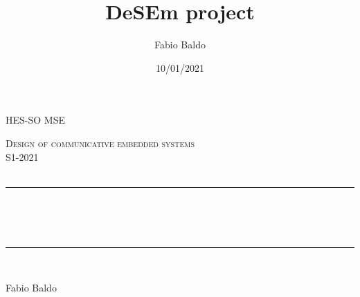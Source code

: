 
\title{DeSEm project}													%
\author{Fabio Baldo}														%
\date{10/01/2021}														%



\makeatletter
\let\thetitle\@title
\let\theauthor\@author
\let\thedate\@date
\makeatother
\pagestyle{fancy}
\fancyhf{}
\rhead{\theauthor}
\lhead{\thetitle}
\cfoot{\thepage}
\newcommand{\mis}[3]{(#1 \pm #2) \ #3}
\newcommand{\misp}[3]{(#1 \#3 \pm #2}



\begin{titlepage}
	
    \begin{center}				
    \textsc{\LARGE HES-SO MSE}\\[2.0 cm]						%
    
        \vspace*{2.00 cm}
    
	\textsc{\Large Design of communicative embedded systems}\\[0.30 cm]		%
	\textsc{\Large S1-2021 }\\[0.5 cm]		%
	\textsc{\Large  }\\[0.5 cm] %
	\rule{\linewidth}{0.2 mm} \\[0.4 cm]
	{ \huge \bfseries \thetitle \\ \small \thedate}\\
	\rule{\linewidth}{0.2 mm} \\[1.5 cm]
	
    	\begin{center}
    	    Fabio Baldo
    	\end{center}
    	
	\end{center}
\end{titlepage}
